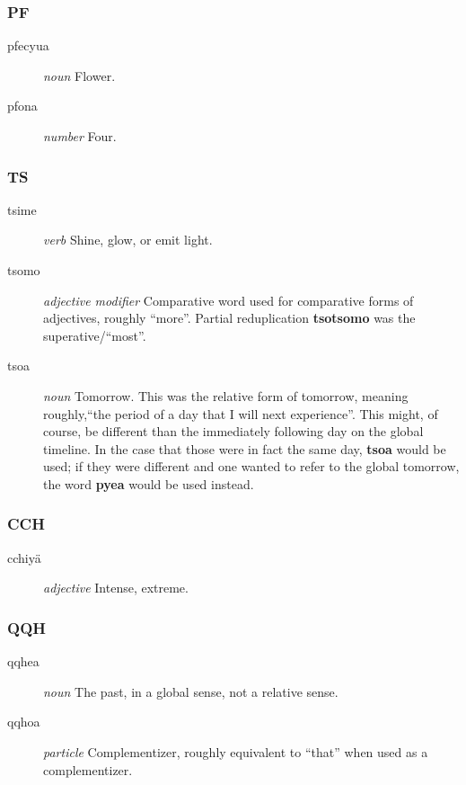 \documentclass{article}
\begin{document}
\subsubsection{PF}

\begin{description}
\item [pfecyua] \emph{noun} Flower.
\item [pfona] \emph{number} Four.
\end{description}

\subsubsection{TS}

\begin{description}
\item [tsime] \emph{verb} Shine, glow, or emit light.
\item [tsomo] \emph{adjective modifier} Comparative word used for comparative forms of adjectives, roughly ``more''.  Partial reduplication \textbf{tsotsomo} was the superative/``most''.
\item [tsoa] \emph{noun} Tomorrow.  This was the relative form of tomorrow, meaning roughly,``the period of a day that I will next experience''.  This might, of course, be different than the immediately following day on the global timeline.  In the case that those were in fact the same day, \textbf{tsoa} would be used; if they were different and one wanted to refer to the global tomorrow, the word \textbf{pyea} would be used instead.
\end{description}

\subsubsection{CCH}

\begin{description}
\item [cchiy\"a] \emph{adjective} Intense, extreme.
\end{description}

\subsubsection{QQH}

\begin{description}
\item [qqhea] \emph{noun} The past, in a global sense, not a relative sense.
\item [qqhoa] \emph{particle} Complementizer, roughly equivalent to ``that'' when used as a complementizer.
\end{description}
\end{document}
